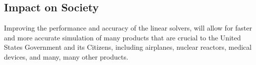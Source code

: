 \subsection{Impact on Society}
Improving the performance and accuracy of the linear solvers, will allow for faster and more accurate simulation of many products that are crucial to the United States Government and its Citizens, including airplanes, nuclear reactors, medical devices, and many, many other products.


